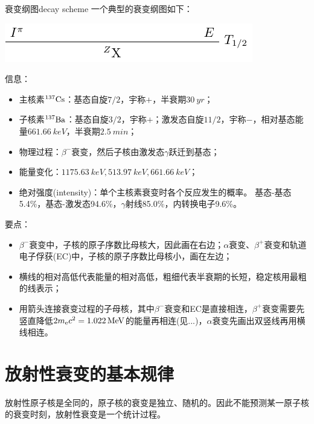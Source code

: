 \begin{definition}
	{衰变纲图}{decay scheme}
	一个典型的衰变纲图如下：
	\begin{center}
		\includegraphics[page=3]{figures/tikz/layouts.pdf}
		\label{fig:decay scheme beta-}
	\end{center}
	信息：
	\begin{itemize}
		\item 主核素${^{137}\mathrm{Cs}}$：基态自旋$7/2$，宇称$+$，半衰期$\SI{30}{yr}$；
		\item 子核素${^{137}\mathrm{Ba}}$：基态自旋$3/2$，宇称$+$；激发态自旋$11/2$，宇称$-$，相对基态能量$\SI{661.66}{keV}$，半衰期$\SI{2.5}{min}$；
		\item 物理过程：$\beta^-$衰变，然后子核由激发态$\gamma$跃迁到基态；
		\item 能量变化：$\SI{1175.63}{keV},\SI{513.97}{keV},\SI{661.66}{keV}$；
		\item 绝对强度(intensity)：单个主核素衰变时各个反应发生的概率。
		基态-基态5.4\%，基态-激发态94.6\%，$\gamma$射线85.0\%，内转换电子9.6\%。
	\end{itemize}
	\tcblower
	要点：
	\begin{itemize}
		\item $\beta^-$衰变中，子核的原子序数比母核大，因此画在右边；$\alpha$衰变、$\beta^+$衰变和轨道电子俘获(EC)中，子核的原子序数比母核小，画在左边；
		\item 横线的相对高低代表能量的相对高低，粗细代表半衰期的长短，稳定核用最粗的线表示；
		\item 用箭头连接衰变过程的子母核，其中$\beta^-$衰变和EC是直接相连，$\beta^+$衰变需要先竖直降低$2m_\mathrm e c^2=\SI{1.022}{MeV}$的能量再相连(见...)，$\alpha$衰变先画出双竖线再用横线相连。
	\end{itemize} 
\end{definition}

\section{放射性衰变的基本规律}

放射性原子核是全同的，原子核的衰变是独立、随机的。因此不能预测某一原子核的衰变时刻，放射性衰变是一个统计过程。

